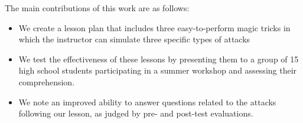 The main contributions of this work are as follows:

\begin{itemize}

\item{We create a lesson plan that includes three easy-to-perform magic
  tricks in which the instructor can simulate three specific types of attacks}

\item{We test the effectiveness of these lessons by presenting them to
  a group of 15 high school students
  participating in a summer workshop and assessing their comprehension.}

\item{We note an improved ability to answer questions related to the
  attacks following our lesson,
    as judged by pre- and post-test evaluations.}
\end{itemize}

